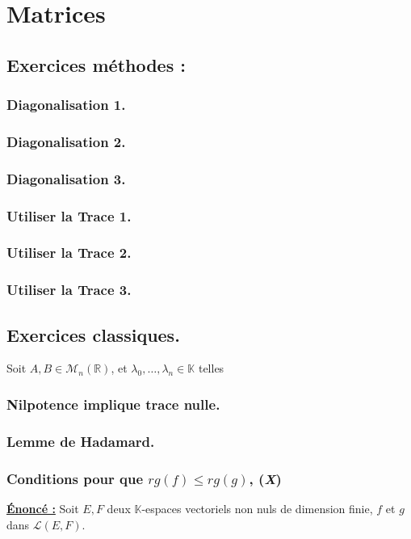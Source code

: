 
\section{Matrices}
\subsection{Exercices méthodes :}
\subsubsection{Diagonalisation 1.}
\subsubsection{Diagonalisation 2.}
\subsubsection{Diagonalisation 3.}

\subsubsection{Utiliser la Trace 1.}
\subsubsection{Utiliser la Trace 2.}
\subsubsection{Utiliser la Trace 3.}

\subsection{Exercices classiques.}
Soit $A,B \in \mathcal{M}_n(\mathbb{R})$, et $\lambda_0,\dots,\lambda_n \in \mathbb{K}$
telles 
\subsubsection{Nilpotence implique trace nulle.}
\subsubsection{Lemme de Hadamard.}
\subsubsection{Conditions pour que $rg(f)\leq rg(g)$, (\textit{X})}
\textbf{\underline{Énoncé :}}
Soit $E,F$ deux $\mathbb{K}$-espaces vectoriels non nuls de dimension finie, 
$f$ et $g$ dans $\mathcal{L}(E,F)$. 

